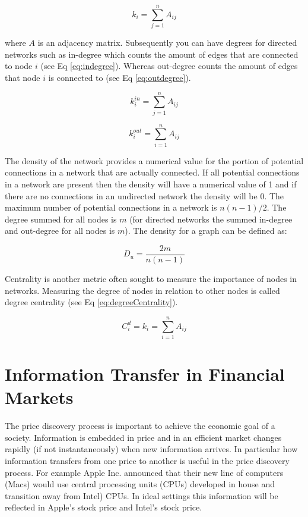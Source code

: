 \begin{equation}
    \label{eq:degree}
    k_i =  \sum_{j=1}^{n}A_{ij}
\end{equation}

\noindent where \(A\) is an adjacency matrix. Subsequently you can have degrees for directed networks such as in-degree which counts the amount of edges that are connected to node \(i\) (see Eq \ref{eq:indegree}). Whereas out-degree counts the amount of edges that node \(i\) is connected to (see Eq \ref{eq:outdegree}).

\begin{equation}
    \label{eq:indegree}
    k_i^{in} =  \sum_{j=1}^{n}A_{ij}
\end{equation}

\begin{equation}
    \label{eq:outdegree}
    k_i^{out} =  \sum_{i=1}^{n}A_{ij}
\end{equation}

\noindent The density of the network provides a numerical value for the portion of potential connections in a network that are actually connected. If all potential connections in a network are present then the density will have a numerical value of 1 and if there are no connections in an undirected network the density will be 0. The maximum number of potential connections in a network is \(n(n-1)/2\).  The degree summed for all nodes is \(m\) (for directed networks the summed in-degree and out-degree for all nodes is \(m\)). The density for a graph can be defined as:

\begin{equation}
    \label{eq:density}
    D_u = \frac{2m}{n (n-1)}
\end{equation}

Centrality is another metric often sought to measure the importance of nodes in networks. Measuring the degree of nodes in relation to other nodes is called degree centrality (see Eq \ref{eq:degreeCentrality}). 

\begin{equation}
    \label{eq:degreeCentrality}
    C_i^d =  k_i = \sum_{i=1}^{n}A_{ij}
\end{equation}



\section{Information Transfer in Financial Markets} \label{IFinFM}
The price discovery process is important to achieve the economic goal of a society. Information is embedded in price and in an efficient market changes rapidly (if not instantaneously) when new information arrives. In particular how information transfers from one price to another is useful in the price discovery process. For example Apple Inc. announced that their new line of computers (Macs) would use central processing units (CPUs) developed in house and transition away from Intel) CPUs. In ideal settings this information will be reflected in Apple's stock price and Intel's stock price.


